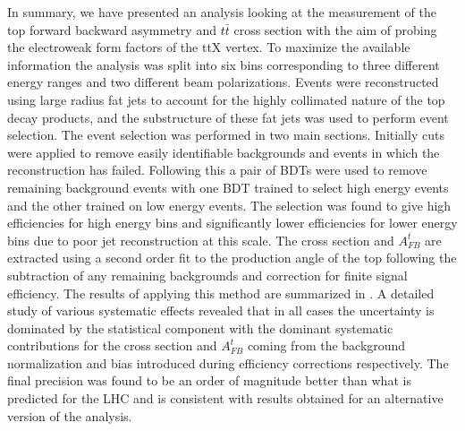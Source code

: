 In summary, we have presented an analysis looking at the measurement of the top forward backward asymmetry and $t\bar{t}$ cross section with the aim of probing the electroweak form factors of the ttX vertex. To maximize the available information the analysis was split into six bins corresponding to three different energy ranges and two different beam polarizations. Events were reconstructed using large radius fat jets to account for the highly collimated nature of the top decay products, and the substructure of these fat jets was used to perform event selection. The event selection was performed in two main sections. Initially cuts were applied to remove easily identifiable backgrounds and events in which the reconstruction has failed. Following this a pair of \ac{BDT}s were used to remove remaining background events with one \ac{BDT} trained to select high energy events and the other trained on low energy events. The selection was found to give high efficiencies for high energy bins and significantly lower efficiencies for lower energy bins due to poor jet reconstruction at this scale. The cross section and $A_{FB}^t$ are extracted using a second order fit to the production angle of the top following the subtraction of any remaining backgrounds and correction for finite signal efficiency. The results of applying this method are summarized in . A detailed study of various systematic effects revealed that in all cases the uncertainty is dominated by the statistical component with the dominant systematic contributions for the cross section and $A_{FB}^t$ coming from the background normalization and bias introduced during efficiency corrections respectively. The final precision was found to be an order of magnitude better than what is predicted for the \ac{LHC}\cite{Bai:2011uk} and is consistent with results obtained for an alternative version of the analysis\cite{TopPaperDraft}.


